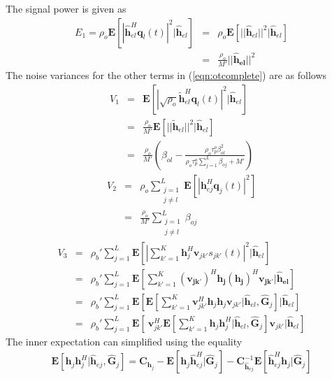 \documentclass[10pt, a4paper, twoside,fleqn]{article}
\begin{document}
The signal power is given as
\begin{eqnarray}
E_1 = \rho_o\pmb{E}[|\pmb{\hat h}_{el}^H \pmb{q}_l(t)|^2 | \pmb{\hat h}_{el}] &=& \rho_o\pmb{E}[||\pmb{\hat h}_{el}||^2 | \pmb{\hat h}_{el}] \nonumber \\     &=& \frac{\rho_o}{M'} ||\pmb{\hat h_{el}}||^2
\end{eqnarray}
The noise variances for the other terms in (\ref{eqn:otcomplete}) are as follows
\begin{eqnarray}\label{eqn:otv1}
	V_1 &=& \pmb{E}[|\sqrt{\rho_o}\pmb{\widetilde{h}}_{el}^H \pmb{q}_l(t)|^2|\pmb{\hat h}_{el}] \nonumber \\
            &=& \frac{\rho_o}{M'} \pmb{E}[||\pmb{\widetilde{h}}_{el}||^2 |\pmb{\hat h}_{el}] \nonumber \\
            &=& \frac{\rho_o}{M'}\left(\beta_{ol}-\frac{\rho_o\tau_p^o\beta^2_{ol}}{\rho_o\tau_p^o\sum_{j=1}^{L}\beta_{oj}+M'}\right)          
\end{eqnarray}
\begin{eqnarray}\label{eqn:otv2}
	V_2 &=& \rho_o \sum_{\substack{j=1 \\ j \neq l}}^{L} \pmb{E}[|\pmb{h}^H_{ej} \pmb{q}_j(t)|^2] \nonumber \\
            &=& \frac{\rho_o}{M'} \sum_{\substack{j=1 \\ j\neq l}}^{L} \beta_{oj}
\end{eqnarray}
\begin{eqnarray}
	V_3 &=& \rho_b' \sum_{j=1}^{L} \pmb{E}\left[\left|\sum_{k'=1}^{K} \pmb{h}^H_j \pmb{v}_{jk'}s_{jk'}(t) \right|^2 | \pmb{\hat h}_{el} \right] \nonumber \\
            &=& \rho_b' \sum_{j=1}^{L} \pmb{E}\left[\sum_{k'=1}^{K} (\pmb{v_{jk'}})^H \pmb{h_j}  (\pmb{h_j})^H \pmb{v_{jk'}}| \pmb{\hat h_{el}} \right] \nonumber \\
            &=& \rho_b' \sum_{j=1}^{L} \pmb{E}\left[\pmb{E}\left[\sum_{k'=1}^{K} \pmb{v}^H_{jk'} \pmb{h}_j  \pmb{h}_j \pmb{v}_{jk'}| \pmb{\hat h}_{el},  \pmb{\hat G}_{j} \right] | \pmb{\hat h}_{el}\right] \nonumber \\
            &=& \rho_b' \sum_{j=1}^{L} \pmb{E}\left[\ \pmb{v}^H_{jk'} \pmb{E}\left[\sum_{k'=1}^{K} \pmb{h}_j  \pmb{h}^H_j | \pmb{\hat h}_{el},  \pmb{\hat G}_{j} \right] \pmb{v}_{jk'}| \pmb{\hat h}_{el}\right]
\end{eqnarray}
The inner expectation can simplified using the equality \cite{bib:rmtBook}
\begin{eqnarray}
	\pmb{E}[\pmb{h}_j\pmb{h}^H_j|\pmb{\hat h}_{ej}, \pmb{\hat G}_{j}] = \pmb{C}_{\pmb{h}_j}-\pmb{E}[\pmb{h}_j \pmb{\hat h}^H_{ej}| \pmb{\hat G}_{j}] - \pmb{C}_{\pmb{\hat h}_{ej}}^{-1}\pmb{E}[\pmb{\hat h}_{ej}^H \pmb{h}_j| \pmb{\hat G}_{j}]
\end{eqnarray}
\end{document}
